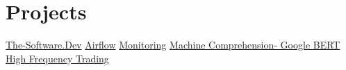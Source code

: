 \documentclass[]{Vishnu-Resume}
\begin{document}
\begin{minipage}[t]{0.66\textwidth}
\section{Projects}
\textbullet{} \href{https://github.com/zxingz/WebApp}{The-Software.Dev} \textbullet{} \href{https://github.com/zxingz/Workflow}{Airflow} \textbullet{} \href{https://github.com/zxingz/Monitoring}{Monitoring} \textbullet{} \href{https://github.com/zxingz/machine_comprehension}{Machine Comprehension- Google BERT}  \textbullet{} \href{https://github.com/zxingz/trader}{High Frequency Trading}

\end{minipage} 
\end{document}
